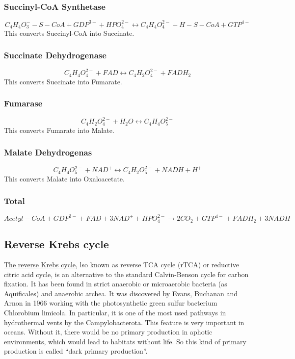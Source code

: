 \documentclass{article}
\begin{document}
\subsubsection{Succinyl-CoA Synthetase}
\[
    C_4H_4O_3^{-}-S-CoA + GDP^{3-} + HPO_4^{2-} \leftrightarrow C_4H_4O_4^{2-} + H-S-CoA + GTP^{4-}
\]
This converts Succinyl-CoA into Succinate.

\subsubsection{Succinate Dehydrogenase}
\[
    C_4H_4O_4^{2-} + FAD \leftrightarrow C_4H_2O_4^{2-} + FADH_2
\]
This converts Succinate into Fumarate.

\subsubsection{Fumarase}
\[
    C_4H_2O_4^{2-} + H_2O \leftrightarrow C_4H_4O_5^{2-}
\]
This converts Fumarate into Malate.

\subsubsection{Malate Dehydrogenas}
\[
    C_4H_4O_5^{2-} + NAD^+ \leftrightarrow C_4H_2O_5^{2-} + NADH + H^+
\]
This converts Malate into Oxaloacetate.

\subsubsection{Total}
\[
    Acetyl-CoA + GDP^{3-} + FAD + 3NAD^+ + HPO_4^{2-} \rightarrow 2CO_2 + GTP^{4-} + FADH_2 + 3NADH
\]


\subsection{Reverse Krebs cycle}
\href{https://en.wikipedia.org/wiki/Biological_carbon_fixation}{The reverse Krebs cycle},
lso known as reverse TCA cycle (rTCA) or reductive citric acid
cycle, is an alternative to the standard Calvin-Benson cycle for carbon fixation. It has
been found in strict anaerobic or microaerobic bacteria (as Aquificales) and anaerobic
archea. It was discovered by Evans, Buchanan and Arnon in 1966 working with the
photosynthetic green sulfur bacterium Chlorobium limicola. In particular, it is one of
the most used pathways in hydrothermal vents by the Campylobacterota. This feature is
very important in oceans. Without it, there would be no primary production in aphotic
environments, which would lead to habitats without life. So this kind of primary
production is called ``dark primary production''.
\end{document}
